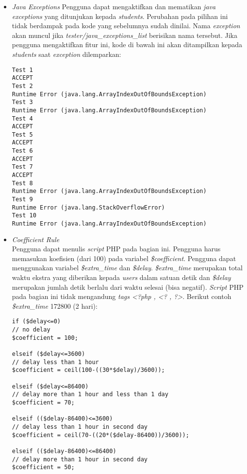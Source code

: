 \begin{itemize}
	\item \textit{Java Exceptions}
	Pengguna dapat mengaktifkan dan mematikan \textit{java exceptions} yang ditunjukan kepada \textit{students}. Perubahan pada pilihan ini tidak berdampak pada kode yang sebelumnya sudah dinilai. Nama \textit{exception} akan muncul jika \textit{tester/java\_exceptions\_list} berisikan nama tersebut. Jika pengguna mengaktifkan fitur ini, kode di bawah ini akan ditampilkan kepada \textit{students} saat \textit{exception} dilemparkan: \newpage
	\begin{lstlisting}[basicstyle=\ttfamily, frame=single,
columns=fullflexible, keepspaces=true, breaklines=true]
Test 1
ACCEPT
Test 2
Runtime Error (java.lang.ArrayIndexOutOfBoundsException)
Test 3
Runtime Error (java.lang.ArrayIndexOutOfBoundsException)
Test 4
ACCEPT
Test 5
ACCEPT
Test 6
ACCEPT
Test 7
ACCEPT
Test 8
Runtime Error (java.lang.ArrayIndexOutOfBoundsException)
Test 9
Runtime Error (java.lang.StackOverflowError)
Test 10
Runtime Error (java.lang.ArrayIndexOutOfBoundsException)
\end{lstlisting}
	
	\item \textit{\textit{Coefficient Rule}} \\
	Pengguna dapat menulis \textit{script} PHP pada bagian ini. Pengguna harus memasukan koefisien (dari 100) pada variabel \textit{\$coefficient}. Pengguna dapat menggunakan variabel \textit{\$extra\_time} dan \textit{\$delay}. \textit{\$extra\_time} merupakan total waktu ekstra yang diberikan kepada \textit{users} dalam satuan detik dan \textit{\$delay} merupakan jumlah detik berlalu dari waktu selesai (bisa negatif). \textit{Script} PHP pada bagian ini tidak mengandung \textit{tags <?php , <? , ?>}. Berikut contoh \textit{\$extra\_time} 172800 (2 hari):
	\begin{lstlisting}[basicstyle=\ttfamily, frame=single,
columns=fullflexible, keepspaces=true, breaklines=true]
if ($delay<=0)
// no delay
$coefficient = 100;

elseif ($delay<=3600)
// delay less than 1 hour
$coefficient = ceil(100-((30*$delay)/3600));

elseif ($delay<=86400)
// delay more than 1 hour and less than 1 day
$coefficient = 70;

elseif (($delay-86400)<=3600)
// delay less than 1 hour in second day
$coefficient = ceil(70-((20*($delay-86400))/3600));

elseif (($delay-86400)<=86400)
// delay more than 1 hour in second day
$coefficient = 50;


\end{lstlisting}
\end{itemize}
